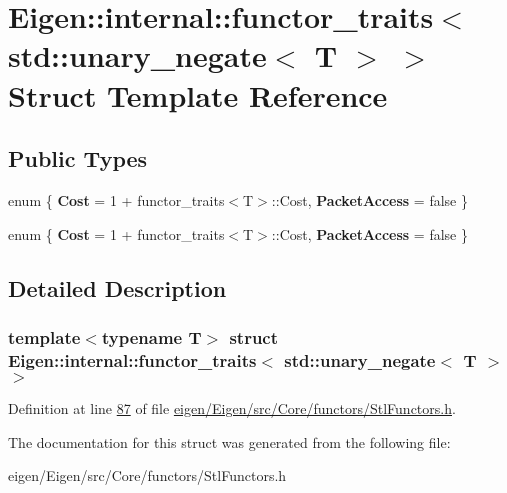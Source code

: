 \hypertarget{struct_eigen_1_1internal_1_1functor__traits_3_01std_1_1unary__negate_3_01_t_01_4_01_4}{}\section{Eigen\+:\+:internal\+:\+:functor\+\_\+traits$<$ std\+:\+:unary\+\_\+negate$<$ T $>$ $>$ Struct Template Reference}
\label{struct_eigen_1_1internal_1_1functor__traits_3_01std_1_1unary__negate_3_01_t_01_4_01_4}
\subsection*{Public Types}
\begin{DoxyCompactItemize}
\item 
\mbox{\label{struct_eigen_1_1internal_1_1functor__traits_3_01std_1_1unary__negate_3_01_t_01_4_01_4_ac66cee9ecf0077d580eabb9a403514c7}} 
enum \{ {\bfseries Cost} = 1 + functor\+\_\+traits$<$T$>$\+:\+:Cost, 
{\bfseries Packet\+Access} = false
 \}
\item 
\mbox{\label{struct_eigen_1_1internal_1_1functor__traits_3_01std_1_1unary__negate_3_01_t_01_4_01_4_ac32c686ca09c1f2eae51d569f1cc9209}} 
enum \{ {\bfseries Cost} = 1 + functor\+\_\+traits$<$T$>$\+:\+:Cost, 
{\bfseries Packet\+Access} = false
 \}
\end{DoxyCompactItemize}


\subsection{Detailed Description}
\subsubsection*{template$<$typename T$>$\newline
struct Eigen\+::internal\+::functor\+\_\+traits$<$ std\+::unary\+\_\+negate$<$ T $>$ $>$}



Definition at line \hyperlink{eigen_2_eigen_2src_2_core_2functors_2_stl_functors_8h_source_l00087}{87} of file \hyperlink{eigen_2_eigen_2src_2_core_2functors_2_stl_functors_8h_source}{eigen/\+Eigen/src/\+Core/functors/\+Stl\+Functors.\+h}.



The documentation for this struct was generated from the following file\+:\begin{DoxyCompactItemize}
\item 
eigen/\+Eigen/src/\+Core/functors/\+Stl\+Functors.\+h\end{DoxyCompactItemize}
